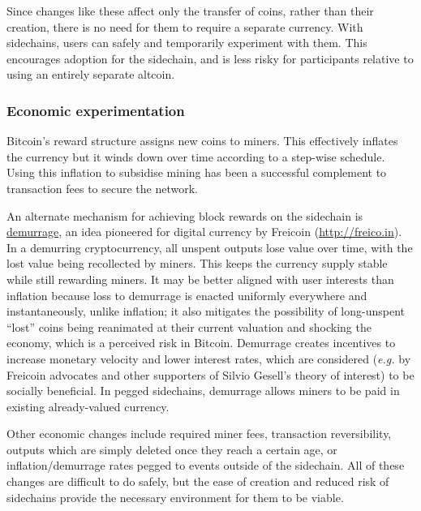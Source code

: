 \documentclass[letterpaper]{article}
\newcommand{\sidechain}{sidechain\xspace}
\newcommand{\sidechains}{sidechains\xspace}
\newcommand{\peggedsidechains}{pegged sidechains\xspace}
\newcommand{\altcoin}{altcoin\xspace}
\begin{document}
Since changes like these affect only the transfer of coins,                        
rather than their creation, there is no need for them to require a separate currency. With \sidechains, users can safely and                            
temporarily experiment with them. This encourages adoption for the
\sidechain, and is less risky for participants relative to using an entirely separate \altcoin.                                                          
                                                                                               
\subsubsection{Economic experimentation}

Bitcoin's reward structure assigns new coins to miners. 
This effectively inflates the currency but it winds down over time according to a
step-wise schedule. Using this inflation to subsidise mining has been a successful
complement to transaction fees to secure the network.

An alternate mechanism for achieving block rewards on the \sidechain is \href{http://en.wikipedia.org/wiki/Demurrage\_(currency)}{demurrage},
an idea pioneered for digital currency by Freicoin (\url{http://freico.in}).
In a demurring cryptocurrency, all unspent outputs lose value over time, with the lost
value being recollected by miners. This keeps the currency supply stable while
still rewarding miners. It may be better aligned with user interests than inflation because loss to demurrage is
enacted uniformly everywhere and instantaneously, unlike inflation; it also
mitigates the possibility of long-unspent ``lost'' coins being reanimated at their
current valuation and shocking the economy, which is a perceived risk in Bitcoin.
Demurrage creates incentives to increase monetary velocity and lower interest
rates, which are considered (\emph{e.g.} by Freicoin advocates and other supporters of
Silvio Gesell’s theory of interest\cite{gesell1916}) to be socially
beneficial. In \peggedsidechains, demurrage allows miners to
be paid in existing already-valued currency.

Other economic changes include required miner fees, transaction reversibility,
outputs which are simply deleted once they reach a certain age, or
inflation/demurrage rates pegged to events outside of the \sidechain. All of these changes
are difficult to do safely, but the ease of creation and reduced risk of \sidechains
provide the necessary environment for them to be viable.
\end{document}
